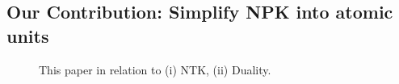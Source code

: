 \subsection{Our Contribution: Simplify NPK into atomic units}
\FloatBarrier
\begin{figure}[h]
\centering
{}
\caption{This paper in relation to (i) NTK, (ii) Duality.}
\label{fig:related}
\end{figure}

